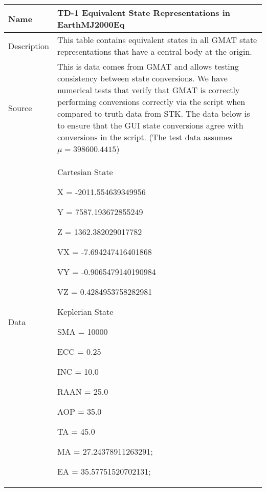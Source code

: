 
\begin{table}[htbp!]
\centering
      \begin{tabular}{|p{1.0 in} |p{5.0 in} |}
         \hline
          \rowcolor[rgb]{0.8,0.8,0.8}  Name & TD-1 Equivalent State Representations in EarthMJ2000Eq\\
         \hline
         Description & This table contains equivalent states in all GMAT state representations
         that have a central body at the origin.    \\ \hline
         Source &  This is data comes from GMAT and allows testing consistency between state conversions.  We have numerical tests
         that verify that GMAT is correctly performing conversions correctly via the script when compared to
         truth data from STK.  The data below is to ensure that the GUI state conversions agree with conversions in the script. (The test data assumes $\mu = 398600.4415$)\\
         \hline
         Data &
          \begin{compactenum}
              \item Cartesian State
              \begin{compactenum}
                  \item X = -2011.554639349956
                  \item Y = 7587.193672855249
                  \item Z = 1362.382029017782
                  \item VX = -7.694247416401868
                  \item VY = -0.9065479140190984
                  \item VZ = 0.4284953758282981
              \end{compactenum}
              \item Keplerian State
              \begin{compactenum}
                  \item SMA = 10000
                  \item ECC = 0.25
                  \item INC = 10.0
                  \item RAAN = 25.0
                  \item AOP = 35.0
                  \item TA = 45.0
                  \item MA = 27.24378911263291;
                  \item EA = 35.57751520702131;

\end{compactenum}
\end{compactenum}
\end{tabular}
\end{table}
